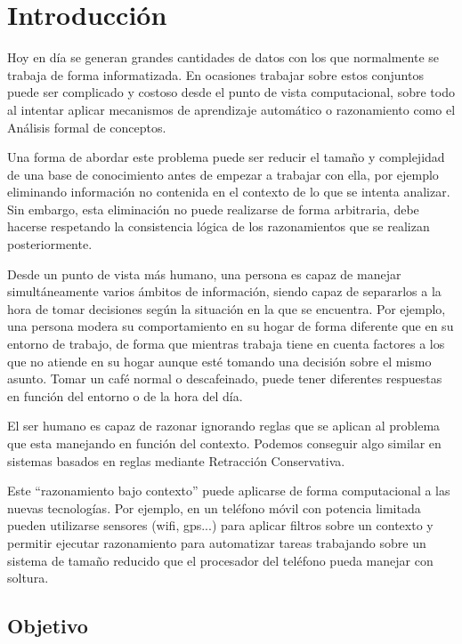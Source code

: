 
\chapter*{Introducción}


	Hoy en día se generan grandes cantidades de datos con los que normalmente se trabaja de forma informatizada. En ocasiones trabajar sobre estos conjuntos puede ser complicado y costoso desde el punto de vista computacional, sobre todo al intentar aplicar mecanismos de aprendizaje automático o razonamiento como el Análisis formal de conceptos.
	
	Una forma de abordar este problema puede ser reducir el tamaño y complejidad de una base de conocimiento antes de empezar a trabajar con ella, por ejemplo eliminando información no contenida en el contexto de  lo que se intenta analizar. Sin embargo, esta eliminación no puede realizarse de forma arbitraria, debe hacerse respetando la consistencia lógica de los razonamientos que se realizan posteriormente.    
	
	Desde un punto de vista más humano, una persona es capaz de manejar simultáneamente varios
	ámbitos de información, siendo capaz de separarlos a la hora de tomar decisiones según la 
	situación en la que se encuentra. Por ejemplo, una persona modera su comportamiento en su hogar
	de forma diferente que en su entorno de trabajo, de forma que mientras trabaja tiene en cuenta factores
	a los que no atiende en su hogar aunque esté tomando una decisión sobre el mismo asunto. Tomar un café 
	normal o descafeinado, puede tener diferentes respuestas en función del entorno o de la hora del día.
	
	El ser humano es capaz de razonar ignorando reglas que se aplican al problema que esta manejando en función del contexto. Podemos conseguir
	algo similar en sistemas basados en reglas mediante Retracción Conservativa.
	
	Este ``razonamiento bajo contexto'' puede aplicarse de forma computacional a las nuevas tecnologías. Por ejemplo, en un teléfono móvil con potencia limitada pueden utilizarse sensores (wifi, gps...) para aplicar filtros sobre un contexto y permitir ejecutar razonamiento para automatizar tareas trabajando sobre un sistema de tamaño reducido que el procesador del teléfono pueda manejar con soltura.
	
 
\section*{Objetivo}


